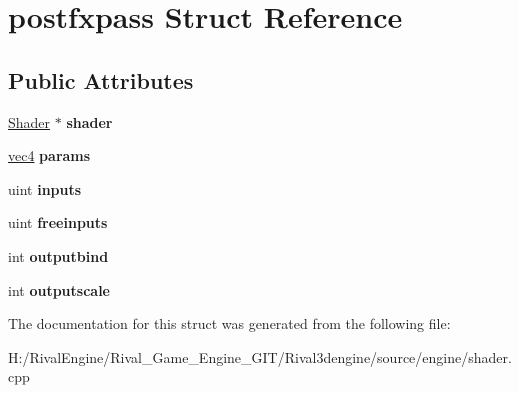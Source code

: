 \hypertarget{structpostfxpass}{}\section{postfxpass Struct Reference}
\label{structpostfxpass}
\subsection*{Public Attributes}
\begin{DoxyCompactItemize}
\item 
\mbox{\label{structpostfxpass_af8fda97c7c944eacf164446f7e9892fc}} 
\hyperlink{struct_shader}{Shader} $\ast$ {\bfseries shader}
\item 
\mbox{\label{structpostfxpass_a9b281fe8b3ede158ec34de8e4b8e3268}} 
\hyperlink{structvec4}{vec4} {\bfseries params}
\item 
\mbox{\label{structpostfxpass_a02c2f9377890b42a40c65bbd2ae86e50}} 
uint {\bfseries inputs}
\item 
\mbox{\label{structpostfxpass_a193d74e3a5188242102a16ea719cb64a}} 
uint {\bfseries freeinputs}
\item 
\mbox{\label{structpostfxpass_adc58f6b7f4851115c1769f6d1867a4ad}} 
int {\bfseries outputbind}
\item 
\mbox{\label{structpostfxpass_aaaad5bf4eb93687deacd7f7cf3d5a398}} 
int {\bfseries outputscale}
\end{DoxyCompactItemize}


The documentation for this struct was generated from the following file\+:\begin{DoxyCompactItemize}
\item 
H\+:/\+Rival\+Engine/\+Rival\+\_\+\+Game\+\_\+\+Engine\+\_\+\+G\+I\+T/\+Rival3dengine/source/engine/shader.\+cpp\end{DoxyCompactItemize}
